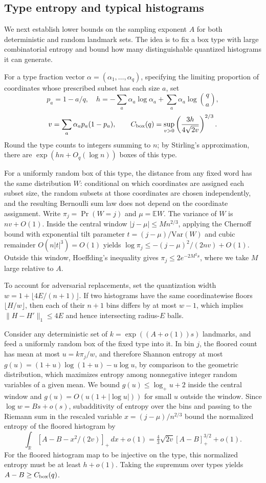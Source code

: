 \subsection{Type entropy and typical histograms}
We next establish lower bounds on the sampling exponent $A$ for both deterministic and random landmark sets. The idea is to fix a box type with large combinatorial entropy and bound how many distinguishable quantized histograms it can generate.

For a type fraction vector $\alpha=(\alpha_1,\ldots,\alpha_q)$, specifying the limiting proportion of coordinates whose prescribed subset has each size $a$, set
\[
 p_a=1-a/q,\quad h=-\sum_a\alpha_a\log\alpha_a+
 \sum_a\alpha_a\log\binom qa,
\]\[
 v=\sum_a\alpha_a p_a(1-p_a),
 \qquad C_{\rm box}(q)=\sup_{v>0}\left(\frac{3h}{4\sqrt{2v}}\right)^{2/3}.
\]
Round the type counts to integers summing to $n$; by Stirling's approximation, there are $\exp(hn+O_q(\log n))$ boxes of this type.

For a uniformly random box of this type, the distance from any fixed word has the same distribution $W$: conditional on which coordinates are assigned each subset size, the random subsets at those coordinates are chosen independently, and the resulting Bernoulli sum law does not depend on the coordinate assignment. Write $\pi_j=\Pr(W=j)$ and $\mu=\mathbb EW$. The variance of $W$ is $nv+O(1)$. Inside the central window $|j-\mu|\le Mn^{2/3}$, applying the Chernoff bound with exponential tilt parameter $t=(j-\mu)/\mathrm{Var}(W)$ and cubic remainder $O(n|t|^3)=O(1)$ yields $\log\pi_j\le-(j-\mu)^2/(2nv)+O(1)$. Outside this window, Hoeffding's inequality \cite{Hoeffding} gives $\pi_j\le2e^{-2M^2s}$, where we take $M$ large relative to $A$.

To account for adversarial replacements, set the quantization width $w=1+\lfloor4E/(n+1)\rfloor$. If two histograms have the same coordinatewise floors $\lfloor H/w\rfloor$, then each of their $n+1$ bins differs by at most $w-1$, which implies $\|H-H'\|_1\le4E$ and hence intersecting radius-$E$ balls.

Consider any deterministic set of $k=\exp((A+o(1))s)$ landmarks, and feed a uniformly random box of the fixed type into it. In bin $j$, the floored count has mean at most $u=k\pi_j/w$, and therefore Shannon entropy at most $g(u)=(1+u)\log(1+u)-u\log u$, by comparison to the geometric distribution, which maximizes entropy among nonnegative integer random variables of a given mean. We bound $g(u)\le\log_+u+2$ inside the central window and $g(u)=O(u(1+|\log u|))$ for small $u$ outside the window. Since $\log w=Bs+o(s)$, subadditivity of entropy over the bins and passing to the Riemann sum in the rescaled variable $x=(j-\mu)/n^{2/3}$ bound the normalized entropy of the floored histogram by
\[
 \int_{\mathbb R}[A-B-x^2/(2v)]_+\,dx+o(1)
 =\tfrac43\sqrt{2v}[A-B]_+^{3/2}+o(1).
\]
For the floored histogram map to be injective on the type, this normalized entropy must be at least $h+o(1)$. Taking the supremum over types yields $A-B\ge C_{\rm box}(q)$.

